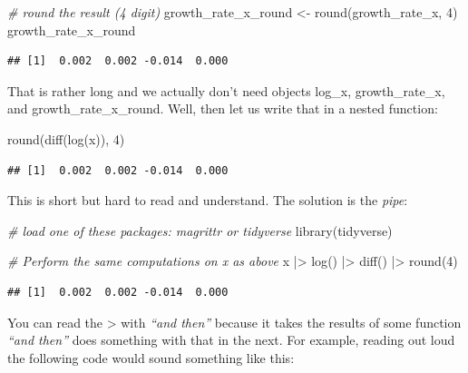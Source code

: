\documentclass[
  12pt,
  oneside]{book}
\newenvironment{Shaded}{\begin{snugshade}}{\end{snugshade}}
\newcommand{\CommentTok}[1]{\textcolor[rgb]{0.56,0.35,0.01}{\textit{#1}}}
\newcommand{\DecValTok}[1]{\textcolor[rgb]{0.00,0.00,0.81}{#1}}
\newcommand{\FunctionTok}[1]{\textcolor[rgb]{0.00,0.00,0.00}{#1}}
\newcommand{\NormalTok}[1]{#1}
\newcommand{\OtherTok}[1]{\textcolor[rgb]{0.56,0.35,0.01}{#1}}
\newcommand{\SpecialCharTok}[1]{\textcolor[rgb]{0.00,0.00,0.00}{#1}}
\theoremstyle{definition}
\theoremstyle{definition}
\theoremstyle{definition}
\theoremstyle{definition}
\theoremstyle{remark}
\begin{document}
\begin{Shaded}
\begin{Highlighting}[]
\CommentTok{\# round the result (4 digit)}
\NormalTok{growth\_rate\_x\_round }\OtherTok{\textless{}{-}} \FunctionTok{round}\NormalTok{(growth\_rate\_x, }\DecValTok{4}\NormalTok{)}
\NormalTok{growth\_rate\_x\_round }
\end{Highlighting}
\end{Shaded}

\begin{verbatim}
## [1]  0.002  0.002 -0.014  0.000
\end{verbatim}

That is rather long and we actually don't need objects log\_x, growth\_rate\_x, and growth\_rate\_x\_round.
Well, then let us write that in a nested function:

\begin{Shaded}
\begin{Highlighting}[]
\FunctionTok{round}\NormalTok{(}\FunctionTok{diff}\NormalTok{(}\FunctionTok{log}\NormalTok{(x)), }\DecValTok{4}\NormalTok{)}
\end{Highlighting}
\end{Shaded}

\begin{verbatim}
## [1]  0.002  0.002 -0.014  0.000
\end{verbatim}

This is short but hard to read and understand. The solution is the \emph{pipe}:

\begin{Shaded}
\begin{Highlighting}[]
\CommentTok{\# load one of these packages: \textasciigrave{}magrittr\textasciigrave{} or \textasciigrave{}tidyverse\textasciigrave{}}
\FunctionTok{library}\NormalTok{(tidyverse)}

\CommentTok{\# Perform the same computations on \textasciigrave{}x\textasciigrave{} as above}
\NormalTok{x }\SpecialCharTok{|\textgreater{}} 
  \FunctionTok{log}\NormalTok{() }\SpecialCharTok{|\textgreater{}}
  \FunctionTok{diff}\NormalTok{() }\SpecialCharTok{|\textgreater{}}
  \FunctionTok{round}\NormalTok{(}\DecValTok{4}\NormalTok{)}
\end{Highlighting}
\end{Shaded}

\begin{verbatim}
## [1]  0.002  0.002 -0.014  0.000
\end{verbatim}

You can read the \textbar\textgreater{} with \emph{``and then''} because it takes the results of some function \emph{``and then''} does something with that in the next.
For example, reading out loud the following code would sound something like this:
\end{document}
